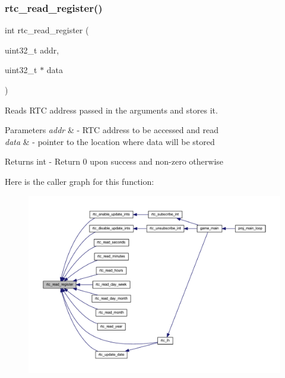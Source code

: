 \subsubsection{\texorpdfstring{rtc\+\_\+read\+\_\+register()}{rtc\_read\_register()}}
{\footnotesize\ttfamily int rtc\+\_\+read\+\_\+register (\begin{DoxyParamCaption}\item[{uint32\+\_\+t}]{addr,  }\item[{uint32\+\_\+t $\ast$}]{data }\end{DoxyParamCaption})}



Reads R\+TC address passed in the arguments and stores it. 


\begin{DoxyParams}{Parameters}
{\em addr} & -\/ R\+TC address to be accessed and read \\
\hline
{\em data} & -\/ pointer to the location where data will be stored \\
\hline
\end{DoxyParams}
\begin{DoxyReturn}{Returns}
int -\/ Return 0 upon success and non-\/zero otherwise 
\end{DoxyReturn}
Here is the caller graph for this function\+:
\nopagebreak
\begin{figure}[H]
\begin{center}
\leavevmode
\includegraphics[width=350pt]{group__rtc_gaf6f18245f611a9c8f64055feae5ec73d_icgraph}
\end{center}
\end{figure}
\mbox{\label{group__rtc_ga3d9330b99a772073f924e69bc1b2df05}} 
